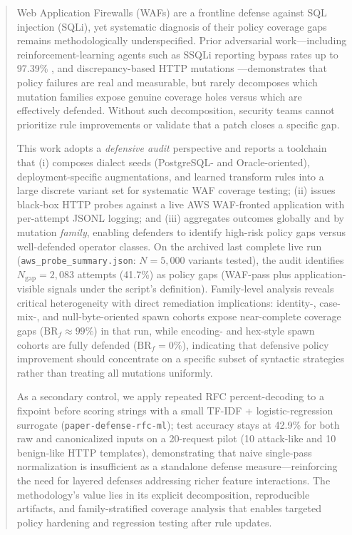 \begin{abstract}
Web Application Firewalls (WAFs) are a frontline defense against SQL injection (SQLi), yet systematic diagnosis of their policy coverage gaps remains methodologically underspecified. Prior adversarial work---including reinforcement-learning agents such as SSQLi reporting bypass rates up to 97.39\% \cite{guan2023ssqli}, and discrepancy-based HTTP mutations \cite{akhavani2025waffled}---demonstrates that policy failures are real and measurable, but rarely decomposes which mutation families expose genuine coverage holes versus which are effectively defended. Without such decomposition, security teams cannot prioritize rule improvements or validate that a patch closes a specific gap.

This work adopts a \emph{defensive audit} perspective and reports a toolchain that (i) composes dialect seeds (PostgreSQL- and Oracle-oriented), deployment-specific augmentations, and learned transform rules into a large discrete variant set for systematic WAF coverage testing; (ii) issues black-box HTTP probes against a live AWS WAF-fronted application with per-attempt JSONL logging; and (iii) aggregates outcomes globally and by mutation \emph{family}, enabling defenders to identify high-risk policy gaps versus well-defended operator classes. On the archived last complete live run (\texttt{aws\_probe\_summary.json}: $N{=}5{,}000$ variants tested), the audit identifies $N_{\mathrm{gap}}{=}2{,}083$ attempts (41.7\%) as policy gaps (WAF-pass plus application-visible signals under the script's definition). Family-level analysis reveals critical heterogeneity with direct remediation implications: identity-, case-mix-, and null-byte-oriented spawn cohorts expose near-complete coverage gaps ($\mathrm{BR}_f{\approx}99\%$) in that run, while encoding- and hex-style spawn cohorts are fully defended ($\mathrm{BR}_f{=}0\%$), indicating that defensive policy improvement should concentrate on a specific subset of syntactic strategies rather than treating all mutations uniformly.

As a secondary control, we apply repeated RFC percent-decoding to a fixpoint before scoring strings with a small TF-IDF + logistic-regression surrogate (\texttt{paper-defense-rfc-ml}); test accuracy stays at 42.9\% for both raw and canonicalized inputs on a 20-request pilot (10 attack-like and 10 benign-like HTTP templates), demonstrating that naive single-pass normalization is insufficient as a standalone defense measure---reinforcing the need for layered defenses addressing richer feature interactions. The methodology's value lies in its explicit decomposition, reproducible artifacts, and family-stratified coverage analysis that enables targeted policy hardening and regression testing after rule updates.
\end{abstract}
